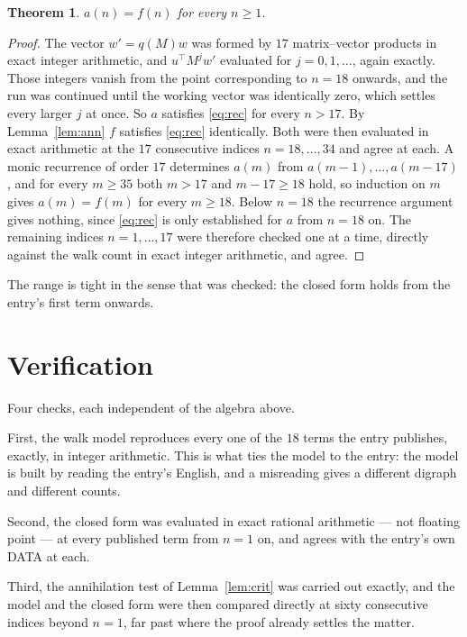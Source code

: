 \documentclass[11pt,a4paper]{article}
\theoremstyle{plain}
\newtheorem{theorem}{Theorem}
\theoremstyle{definition}
\begin{document}
\begin{theorem}
$a(n)=f(n)$ for every $n\ge1$.
\end{theorem}

\begin{proof}
The vector $w'=q(M)w$ was formed by $17$ matrix--vector products in exact integer
arithmetic, and $u^{\!\top}M^{j}w'$ evaluated for $j=0,1,\dots$, again exactly. Those integers
vanish from the point corresponding to $n=18$ onwards, and the run was continued until the
working vector was identically zero, which settles every larger $j$ at once. So $a$ satisfies
\eqref{eq:rec} for every $n>17$. By Lemma~\ref{lem:ann} $f$ satisfies \eqref{eq:rec}
identically. Both were then evaluated in exact arithmetic at the $17$ consecutive indices
$n=18,\dots,34$ and agree at each. A monic recurrence of order $17$
determines $a(m)$ from $a(m-1),\dots,a(m-17)$, and for every $m\ge35$ both
$m>17$ and $m-17\ge18$ hold, so induction on $m$ gives $a(m)=f(m)$ for every
$m\ge18$.
Below $n=18$ the recurrence argument gives nothing, since \eqref{eq:rec} is only
established for $a$ from $n=18$ on. The remaining indices $n=1,\dots,17$ were
therefore checked one at a time, directly against the walk count in exact integer arithmetic,
and agree.
\end{proof}

The range is tight in the sense that was checked: the closed form holds from the entry's first term onwards.

\section{Verification}

Four checks, each independent of the algebra above.

First, the walk model reproduces every one of the $18$ terms the entry publishes,
exactly, in integer arithmetic. This is what ties the model to the entry: the model is built
by reading the entry's English, and a misreading gives a different digraph and different
counts.

Second, the closed form was evaluated in exact rational arithmetic --- not floating point ---
at every published term from $n=1$ on, and agrees with the entry's own DATA at each.

Third, the annihilation test of Lemma~\ref{lem:crit} was carried out exactly, and the model
and the closed form were then compared directly at sixty consecutive indices beyond
$n=1$, far past where the proof already settles the matter.
\end{document}
